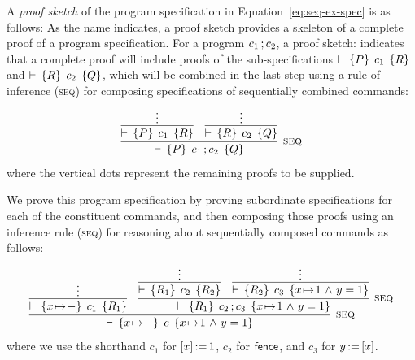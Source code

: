 \documentclass[11pt]{report}
\begin{document}
A \emph{proof sketch} of the program specification in Equation~\ref{eq:seq-ex-spec} is as follows:
As the name indicates, a proof sketch provides a skeleton of a complete proof of a program specification. For a program $c_1 \operatorname{;} c_2$, a proof sketch:  indicates that a complete proof will include proofs of the sub-specifications $\vdash\,\left\lbrace P \right\rbrace\;c_1\;\left\lbrace R \right\rbrace$ and $\vdash\,\left\lbrace R \right\rbrace\;c_2\;\left\lbrace Q \right\rbrace$, which will be combined in the last step using a rule of inference (\textsc{seq}) for composing specifications of sequentially combined commands: 
\[ \infer[{\textsc{seq}}]{\triple{P}{c_1 \opseq c_2}{Q}}{\infer{\triple{P}{c_1}{R}}{\vdots} & \infer{\triple{R}{c_2}{Q}}{\vdots}}\] where the vertical dots represent the remaining proofs to be supplied. 

We prove this program specification by proving subordinate specifications for each of the constituent commands, and then composing those proofs using an inference rule (\textsc{seq}) for reasoning about sequentially composed commands as follows: 
\[
  \infer[\textsc{seq}]{\triple{x \fpointsto -}{c}{x \fpointsto 1 \conj y = 1}}{
    \infer{\triple{x \fpointsto -}{c_1}{R_1}}{\vdots}
    &
    \infer[\textsc{seq}]{\triple{R_1}{\cseq{c_2}{c_3}}{x \fpointsto 1 \conj y = 1}}{\infer{\triple{R_1}{c_2}{R_2}}{\vdots} & \infer{\triple{R_2}{c_3}{x \fpointsto 1 \conj y = 1}}{\vdots}}
  }
\] where we use the shorthand $c_1$ for $\left[ x \right] \operatorname{:\!=} 1$, $c_2$ for $\operatorname{\mathsf{fence}}$, and $c_3$ for $y \operatorname{:\!=} \left[ x \right]$. 
\end{document}
